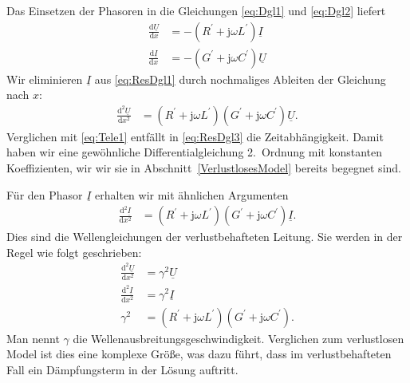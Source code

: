 \documentclass[paper=a4, parskip=half-, ngerman, fontsize=11pt]{scrreprt}
\begin{document}
Das Einsetzen der Phasoren in die Gleichungen \eqref{eq:Dgl1} und \eqref{eq:Dgl2} liefert
\begin{align}
    \frac{\text{d} \underline{U}}{\text{d} x} &= - \left( R^{\prime} + \mathrm{j} \omega L^{\prime} \right)
    \underline{I} \label{eq:ResDgl1} \\[1ex]
    \frac{\text{d} \underline{I}}{\text{d} x} &= - \left( G^{\prime} + \mathrm{j} \omega C^{\prime} \right)
    \underline{U}
\end{align}
Wir eliminieren $\underline{I}$ aus \eqref{eq:ResDgl1} durch nochmaliges Ableiten der Gleichung nach $x$:
\begin{align}
    \frac{\text{d}^{2} \underline{U}}{\text{d} x^{2}} &= \left( R^{\prime} + \mathrm{j} \omega L^{\prime} \right)
    \left( G^{\prime} + \mathrm{j} \omega C^{\prime} \right) \underline{U} \label{eq:ResDgl3}.
\end{align}
Verglichen mit \eqref{eq:Tele1} entfällt in \eqref{eq:ResDgl3} die Zeitabhängigkeit. Damit haben wir eine gewöhnliche
Differentialgleichung 2.~Ordnung mit konstanten Koeffizienten, wir wir sie in Abschnitt~\ref{VerlustlosesModel} bereits
begegnet sind.

Für den Phasor $\underline{I}$ erhalten wir mit ähnlichen Argumenten
\begin{align}
    \frac{\text{d}^{2} \underline{I}}{\text{d} x^{2}} &= \left( R^{\prime} + \mathrm{j} \omega L^{\prime} \right)
    \left( G^{\prime} + \mathrm{j} \omega C^{\prime} \right) \underline{I}.
\end{align}
Dies sind die Wellengleichungen der verlustbehafteten Leitung. Sie werden in der Regel wie folgt geschrieben:
\begin{align}
    \frac{\text{d}^{2} \underline{U}}{\text{d} x^{2}} &= \gamma^{2} \underline{U} \label{eq:VerlustDgl1} \\[1ex]
    \frac{\text{d}^{2} \underline{I}}{\text{d} x^{2}} &= \gamma^{2} \underline{I} \label{eq:VerlustDgl2} \\[1ex]
    \gamma^{2} &= \left( R^{\prime} + \mathrm{j} \omega L^{\prime} \right) \left( G^{\prime} + \mathrm{j} \omega
    C^{\prime} \right).
\end{align}
Man nennt $\gamma$ die Wellenausbreitungsgeschwindigkeit. Verglichen zum verlustlosen Model ist dies eine komplexe
Größe, was dazu führt, dass im verlustbehafteten Fall ein Dämpfungsterm in der Lösung auftritt.
\end{document}

